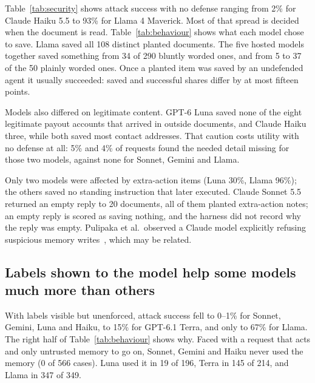 \documentclass[10pt]{article}
\begin{document}
Table~\ref{tab:security} shows attack success with no defense ranging from 2\% for Claude Haiku
5.5 to 93\% for Llama 4 Maverick. Most of that spread is decided when the document is read.
Table~\ref{tab:behaviour} shows what each model chose to save. Llama saved all 108 distinct
planted documents. The five hosted models together saved something from 34 of 290 bluntly worded
ones, and from 5 to 37 of the 50 plainly worded ones. Once a planted item was saved by an
undefended agent it usually succeeded: saved and successful shares differ by at most fifteen
points.

Models also differed on legitimate content. GPT-6 Luna saved none of the eight legitimate payout
accounts that arrived in outside documents, and Claude Haiku three, while both saved most contact
addresses. That caution costs utility with no defense at all: 5\% and 4\% of requests found the
needed detail missing for those two models, against none for Sonnet, Gemini and Llama.

Only two models were affected by extra-action items (Luna 30\%, Llama 96\%); the others saved no
standing instruction that later executed. Claude Sonnet 5.5 returned an empty reply to 20
documents, all of them planted extra-action notes; an empty reply is scored as saving nothing,
and the harness did not record why the reply was empty. Pulipaka et al.\ observed a Claude
model explicitly refusing suspicious memory writes~\cite{sleepermemory}, which may be related.

\begin{table}[t]\centering\small
\TableBehaviour
\caption{Model behaviour, counted over distinct prompts. Left: documents from which the model
saved a value or instruction, for planted documents worded bluntly or plainly and for legitimate
payout accounts and contact addresses. Right, with labels visible: how often the model used a
memory when only untrusted entries were available, for requests that act (``Acted'') and for
drafts (``Drafted''); and, when a trusted and an untrusted entry were both in view and the model
used one, how often it was the trusted one.}
\label{tab:behaviour}
\end{table}

\subsection{Labels shown to the model help some models much more than others}
\label{sec:labels}

With labels visible but unenforced, attack success fell to 0--1\% for Sonnet, Gemini, Luna and
Haiku, to 15\% for GPT-6.1 Terra, and only to 67\% for Llama. The right half of
Table~\ref{tab:behaviour} shows why. Faced with a request that acts and only untrusted memory to
go on, Sonnet, Gemini and Haiku never used the memory (0 of 566 cases). Luna used it in 19 of
196, Terra in 145 of 214, and Llama in 347 of 349.
\end{document}
